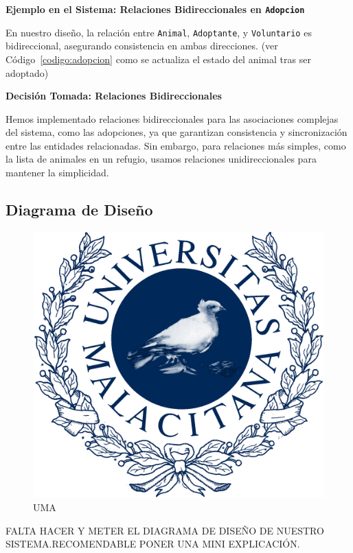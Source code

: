\textbf{Ejemplo en el Sistema: Relaciones Bidireccionales en \texttt{Adopcion}}\par 
En nuestro diseño, la relación entre \texttt{Animal}, \texttt{Adoptante}, y 
\texttt{Voluntario} es bidireccional, asegurando consistencia en ambas direcciones.
(ver Código~\ref{codigo:adopcion} como se actualiza el estado del animal tras ser adoptado)\par
\vspace{0.15cm}
\textbf{Decisión Tomada: Relaciones Bidireccionales}\par
Hemos implementado relaciones bidireccionales para las asociaciones complejas del sistema, 
como las adopciones, ya que garantizan consistencia y sincronización entre las entidades 
relacionadas. Sin embargo, para relaciones más simples, como la lista de animales en un 
refugio, usamos relaciones unidireccionales para mantener la simplicidad.

\subsection{Diagrama de Diseño}

\begin{figure}[H]
    \centering
     \includegraphics[width=1\linewidth]{assets/umaLogo.png}
     \caption{UMA}
\end{figure}
FALTA HACER Y METER EL DIAGRAMA DE DISEÑO DE NUESTRO SISTEMA.RECOMENDABLE PONER UNA MINI EXPLICACIÓN.

